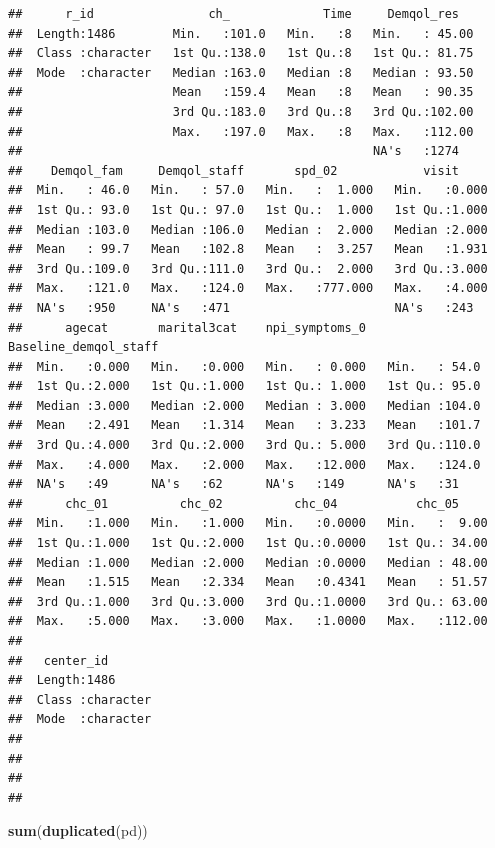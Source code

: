\documentclass[
]{article}
\newenvironment{Shaded}{\begin{snugshade}}{\end{snugshade}}
\newcommand{\FunctionTok}[1]{\textcolor[rgb]{0.13,0.29,0.53}{\textbf{#1}}}
\newcommand{\NormalTok}[1]{#1}
\begin{document}
\begin{verbatim}
##      r_id                ch_             Time     Demqol_res    
##  Length:1486        Min.   :101.0   Min.   :8   Min.   : 45.00  
##  Class :character   1st Qu.:138.0   1st Qu.:8   1st Qu.: 81.75  
##  Mode  :character   Median :163.0   Median :8   Median : 93.50  
##                     Mean   :159.4   Mean   :8   Mean   : 90.35  
##                     3rd Qu.:183.0   3rd Qu.:8   3rd Qu.:102.00  
##                     Max.   :197.0   Max.   :8   Max.   :112.00  
##                                                 NA's   :1274    
##    Demqol_fam     Demqol_staff       spd_02            visit      
##  Min.   : 46.0   Min.   : 57.0   Min.   :  1.000   Min.   :0.000  
##  1st Qu.: 93.0   1st Qu.: 97.0   1st Qu.:  1.000   1st Qu.:1.000  
##  Median :103.0   Median :106.0   Median :  2.000   Median :2.000  
##  Mean   : 99.7   Mean   :102.8   Mean   :  3.257   Mean   :1.931  
##  3rd Qu.:109.0   3rd Qu.:111.0   3rd Qu.:  2.000   3rd Qu.:3.000  
##  Max.   :121.0   Max.   :124.0   Max.   :777.000   Max.   :4.000  
##  NA's   :950     NA's   :471                       NA's   :243    
##      agecat       marital3cat    npi_symptoms_0   Baseline_demqol_staff
##  Min.   :0.000   Min.   :0.000   Min.   : 0.000   Min.   : 54.0        
##  1st Qu.:2.000   1st Qu.:1.000   1st Qu.: 1.000   1st Qu.: 95.0        
##  Median :3.000   Median :2.000   Median : 3.000   Median :104.0        
##  Mean   :2.491   Mean   :1.314   Mean   : 3.233   Mean   :101.7        
##  3rd Qu.:4.000   3rd Qu.:2.000   3rd Qu.: 5.000   3rd Qu.:110.0        
##  Max.   :4.000   Max.   :2.000   Max.   :12.000   Max.   :124.0        
##  NA's   :49      NA's   :62      NA's   :149      NA's   :31           
##      chc_01          chc_02          chc_04           chc_05      
##  Min.   :1.000   Min.   :1.000   Min.   :0.0000   Min.   :  9.00  
##  1st Qu.:1.000   1st Qu.:2.000   1st Qu.:0.0000   1st Qu.: 34.00  
##  Median :1.000   Median :2.000   Median :0.0000   Median : 48.00  
##  Mean   :1.515   Mean   :2.334   Mean   :0.4341   Mean   : 51.57  
##  3rd Qu.:1.000   3rd Qu.:3.000   3rd Qu.:1.0000   3rd Qu.: 63.00  
##  Max.   :5.000   Max.   :3.000   Max.   :1.0000   Max.   :112.00  
##                                                                   
##   center_id        
##  Length:1486       
##  Class :character  
##  Mode  :character  
##                    
##                    
##                    
## 
\end{verbatim}

\begin{Shaded}
\begin{Highlighting}[]
\FunctionTok{sum}\NormalTok{(}\FunctionTok{duplicated}\NormalTok{(pd))}
\end{Highlighting}
\end{Shaded}
\end{document}
